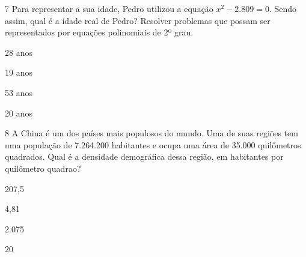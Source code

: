 

\num{7} Para representar a sua idade, Pedro utilizou a equação $x^2 - 2.809 =
0$. Sendo assim, qual é a idade real de Pedro? Resolver problemas que
possam ser representados por equações polinomiais de 2º grau.

\begin{escolha}
\item 28 anos
\item 19 anos
\item 53 anos
\item 20 anos
\end{escolha}











\num{8} A China é um dos países mais populosos do mundo. Uma de suas regiões
tem uma população de 7.264.200 habitantes e ocupa uma área de 35.000 quilômetros quadrados. 
Qual é a densidade demográfica dessa região, em habitantes por quilômetro quadrao?

\begin{escolha}
\item 207,5
\item 4,81
\item 2.075
\item 20
\end{escolha}


